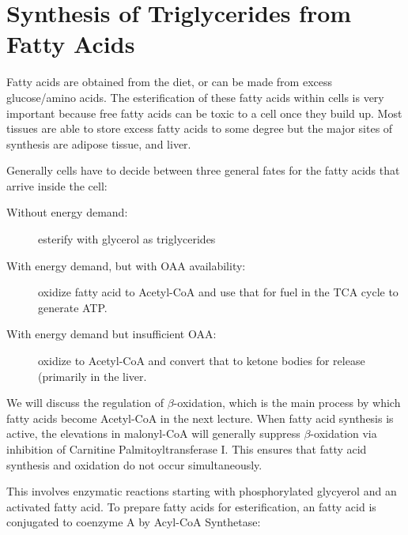 \documentclass{tufte-handout}
\begin{document}
\section{Synthesis of Triglycerides from Fatty Acids}

Fatty acids are obtained from the diet, or can be made from excess glucose/amino acids.  The esterification of these fatty acids within cells is very important because free fatty acids can be toxic to a cell once they build up.  Most tissues are able to store excess fatty acids to some degree but the major sites of synthesis are adipose tissue, and liver.

Generally cells have to decide between three general fates for the fatty acids that arrive inside the cell:
\begin{description}
\item [Without energy demand:] esterify with glycerol as triglycerides
\item [With energy demand, but with OAA availability:] oxidize fatty acid to Acetyl-CoA and use that for fuel in the TCA cycle to generate ATP.
\item [With energy demand but insufficient OAA:] oxidize to Acetyl-CoA and convert that to ketone bodies for release (primarily in the liver.
\end{description}

We will discuss the regulation of $\beta$-oxidation, which is the main process by which fatty acids become Acetyl-CoA in the next lecture.  When fatty acid synthesis is active, the elevations in malonyl-CoA will generally suppress $\beta$-oxidation via inhibition of Carnitine Palmitoyltransferase I.  This ensures that fatty acid synthesis and oxidation do not occur simultaneously.

  This involves enzymatic reactions starting with phosphorylated glycyerol and an activated fatty acid.  To prepare fatty acids for esterification, an fatty acid is conjugated to coenzyme A by Acyl-CoA Synthetase:
\end{document}

